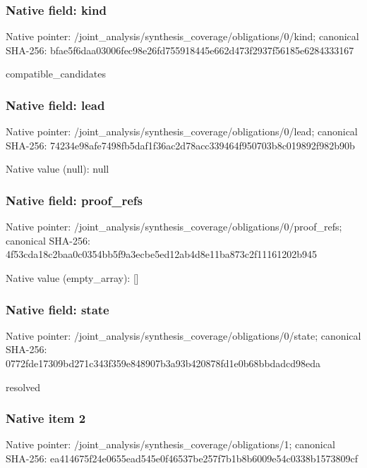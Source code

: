 \documentclass[10pt,a4paper]{article}
\begin{document}
\subsubsection{Native field: kind}
Native pointer: /joint\_\allowbreak{}analysis/synthesis\_\allowbreak{}coverage/obligations/0/kind; canonical SHA-256: bfae5f6daa03006fec98e26fd755918445e662d473f2937f56185e6284333167

\begingroup\raggedright\sloppy compatible\_\allowbreak{}candidates\par\endgroup

\subsubsection{Native field: lead}
Native pointer: /joint\_\allowbreak{}analysis/synthesis\_\allowbreak{}coverage/obligations/0/lead; canonical SHA-256: 74234e98afe7498fb5daf1f36ac2d78acc339464f950703b8c019892f982b90b

Native value (null): null

\subsubsection{Native field: proof\_\allowbreak{}refs}
Native pointer: /joint\_\allowbreak{}analysis/synthesis\_\allowbreak{}coverage/obligations/0/proof\_\allowbreak{}refs; canonical SHA-256: 4f53cda18c2baa0c0354bb5f9a3ecbe5ed12ab4d8e11ba873c2f11161202b945

Native value (empty\_\allowbreak{}array): []

\subsubsection{Native field: state}
Native pointer: /joint\_\allowbreak{}analysis/synthesis\_\allowbreak{}coverage/obligations/0/state; canonical SHA-256: 0772fde17309bd271c343f359e848907b3a93b420878fd1e0b68bbdadcd98eda

\begingroup\raggedright\sloppy resolved\par\endgroup

\subsubsection{Native item 2}
Native pointer: /joint\_\allowbreak{}analysis/synthesis\_\allowbreak{}coverage/obligations/1; canonical SHA-256: ea414675f24e0655ead545e0f46537be257f7b1b8b6009e54c0338b1573809cf
\end{document}
